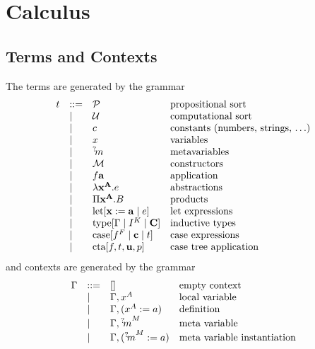 \section{Calculus}





\subsection{Terms and Contexts}



The terms are generated by the grammar
%
$$
\begin{array}{llll}
    t
    &::=&
    {\cal P}
    &\text{propositional sort}
    \\
    &\mid&
    {\cal U}
    &\text{computational sort}
    \\
    &\mid&
    c
    &\text{constants (numbers, strings, $\ldots$)}
    \\
    &\mid&
    x
    &\text{variables}
    \\
    &\mid&
    {{}^? \kern-0.2em m}
    &\text{metavariables}
    \\
    &\mid&
    {\cal M}
    &\text{constructors}
    \\
    &\mid&
    f {\mathbf a}
    & \text{application}
    \\
    &\mid&
    \lambda {\mathbf x}^{{\mathbf A}}. e
    & \text{abstractions}
    \\
    &\mid&
    \Pi {\mathbf x}^{{\mathbf A}}. B
    & \text{products}
    \\
    &\mid&
    {\text{let}}[{\mathbf x} := {\mathbf a} \mid e]
    & \text{let expressions}
    \\
    &\mid&
    {\text{type}}[\Gamma \mid I^K \mid {\mathbf C}]
    & \text{inductive types}
    \\
    &\mid&
    {\text{case}}[f^F \mid {\mathbf c} \mid t]
    & \text{case expressions}
    \\
    &\mid&
    {\text{cta}}[f, t, {\mathbf u}, p]
    &\text{case tree application}
\end{array}
$$
%
and contexts are generated by the grammar
$$
\begin{array}{llll}
    \Gamma
    &::=&
    []
    &\text{empty context}
    \\
    &\mid&
    \Gamma, x^A
    &\text{local variable}
    \\
    &\mid&
    \Gamma, (x^A := a)
    &\text{definition}
    \\
    &\mid&
    \Gamma, {{}^? \kern-0.2em m}^M
    &\text{meta variable}
    \\
    &\mid&
    \Gamma, ({{}^? \kern-0.2em m}^M := a)
    &\text{meta variable instantiation}
\end{array}
$$







